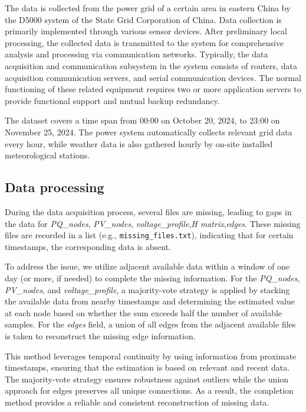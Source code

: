 \documentclass[12pt]{article}
\begin{document}
The data is collected from the power grid of a certain area in eastern China by the D5000 system of the State Grid Corporation of China.
Data collection is primarily implemented through various sensor devices. 
After preliminary local processing, the collected data is transmitted to the system for comprehensive analysis and processing via communication networks. Typically, the data acquisition and communication subsystem in the system consists of routers, data acquisition communication servers, and serial communication devices. The normal functioning of these related equipment requires two or more application servers to provide functional support and mutual backup redundancy.

The dataset covers a time span from 00:00 on October 20, 2024, to 23:00 on November 25, 2024. 
The power system automatically collects relevant grid data every hour, while weather data is also gathered hourly by on-site installed meteorological stations.
\subsection*{Data processing}
During the data acquisition process, several files are missing, leading to gaps in the data for \emph{PQ\_nodes}, \emph{PV\_nodes}, \emph{voltage\_profile},\emph{H matrix},\emph{edges}. These missing files are recorded in a list (e.g., \texttt{missing\_files.txt}), indicating that for certain timestamps, the corresponding data is absent.

To address the issue, we utilize adjacent available data within a window of one day (or more, if needed) to complete the missing information. For the \emph{PQ\_nodes}, \emph{PV\_nodes}, and \emph{voltage\_profile}, a majority-vote strategy is applied by stacking the available data from nearby timestamps and determining the estimated value at each node based on whether the sum exceeds half the number of available samples. For the \emph{edges} field, a union of all edges from the adjacent available files is taken to reconstruct the missing edge information.

This method leverages temporal continuity by using information from proximate timestamps, ensuring that the estimation is based on relevant and recent data. The majority-vote strategy ensures robustness against outliers while the union approach for edges preserves all unique connections. As a result, the completion method provides a reliable and consistent reconstruction of missing data.
\end{document}
